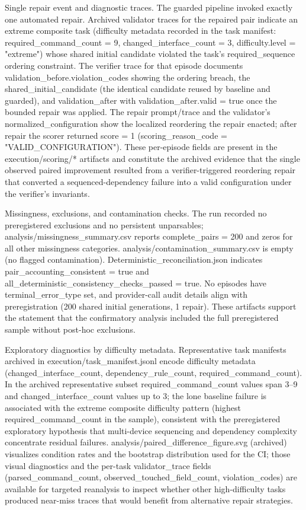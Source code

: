 \documentclass[conference]{IEEEtran}
\begin{document}
Single repair event and diagnostic traces. The guarded pipeline invoked exactly one automated repair. Archived validator traces for the repaired pair indicate an extreme composite task (difficulty metadata recorded in the task manifest: required\_command\_count = 9, changed\_interface\_count = 3, difficulty.level = "extreme") whose shared initial candidate violated the task's required\_sequence ordering constraint. The verifier trace for that episode documents validation\_before.violation\_codes showing the ordering breach, the shared\_initial\_candidate (the identical candidate reused by baseline and guarded), and validation\_after with validation\_after.valid = true once the bounded repair was applied. The repair prompt/trace and the validator's normalized\_configuration show the localized reordering the repair enacted; after repair the scorer returned score = 1 (scoring\_reason\_code = "VALID\_CONFIGURATION"). These per-episode fields are present in the execution/scoring/* artifacts and constitute the archived evidence that the single observed paired improvement resulted from a verifier-triggered reordering repair that converted a sequenced-dependency failure into a valid configuration under the verifier's invariants.

Missingness, exclusions, and contamination checks. The run recorded no preregistered exclusions and no persistent unparsables; analysis/missingness\_summary.csv reports complete\_pairs = 200 and zeros for all other missingness categories. analysis/contamination\_summary.csv is empty (no flagged contamination). Deterministic\_reconciliation.json indicates pair\_accounting\_consistent = true and all\_deterministic\_consistency\_checks\_passed = true. No episodes have terminal\_error\_type set, and provider-call audit details align with preregistration (200 shared initial generations, 1 repair). These artifacts support the statement that the confirmatory analysis included the full preregistered sample without post-hoc exclusions.

Exploratory diagnostics by difficulty metadata. Representative task manifests archived in execution/task\_manifest.jsonl encode difficulty metadata (changed\_interface\_count, dependency\_rule\_count, required\_command\_count). In the archived representative subset required\_command\_count values span 3--9 and changed\_interface\_count values up to 3; the lone baseline failure is associated with the extreme composite difficulty pattern (highest required\_command\_count in the sample), consistent with the preregistered exploratory hypothesis that multi-device sequencing and dependency complexity concentrate residual failures. analysis/paired\_difference\_figure.svg (archived) visualizes condition rates and the bootstrap distribution used for the CI; those visual diagnostics and the per-task validator\_trace fields (parsed\_command\_count, observed\_touched\_field\_count, violation\_codes) are available for targeted reanalysis to inspect whether other high-difficulty tasks produced near-miss traces that would benefit from alternative repair strategies.
\end{document}
